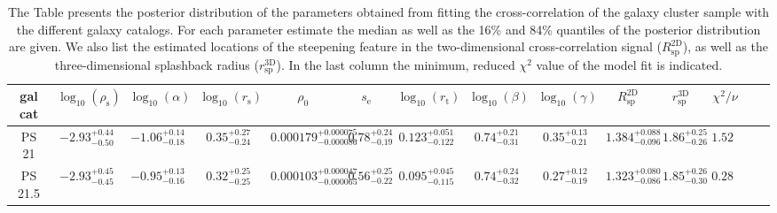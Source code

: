 \documentclass[iop, apjl, twocolappendix, numberedappendix]{emulateapj}
\begin{document}

\begin{table}
    \centering
    \caption{The Table presents the posterior distribution of the parameters obtained from fitting the cross-correlation of the galaxy cluster sample with the different galaxy catalogs. For each parameter estimate the median as well as the 16\% and 84\% quantiles of the posterior distribution are given. We also list the estimated locations of the steepening feature in the two-dimensional cross-correlation signal ($R_{\mathrm{sp}}^{\mathrm{2D}}$), as well as the three-dimensional splashback radius ($r_{\mathrm{sp}}^{\mathrm{3D}}$). In the last column the minimum, reduced $\chi^2$ value of the model fit is indicated.}
    \label{tab:fit_parameters}
    \begin{tabular}{cccccccccccccc}
    \hline 
gal cat & $\log_{10}(\rho_{\mathrm{s}})$ & $\log_{10}(\alpha)$ & $\log_{10}(r_{\mathrm{s}})$ & $\rho_{\mathrm{0}}$ & $s_{\mathrm{e}}$ & $\log_{10}(r_{\mathrm{t}})$ & $\log_{10}(\beta)$ & $\log_{10}(\gamma)$ & $R_{\mathrm{sp}}^{\mathrm{2D}}$ & $r_{\mathrm{sp}}^{\mathrm{3D}}$ & $\chi^2/\nu$ \\
\hline 
\hline 
PS 21 & $-2.93_{-0.50}^{+0.44}$ & $-1.06_{-0.18}^{+0.14}$ & $0.35_{-0.24}^{+0.27}$ & $0.000179_{-0.000086}^{+0.000075}$ & $0.78_{-0.19}^{+0.24}$ & $0.123_{-0.122}^{+0.051}$ & $0.74_{-0.31}^{+0.21}$ & $0.35_{-0.21}^{+0.13}$ &$1.384_{-0.096}^{+0.088}$&$1.86_{-0.26}^{+0.25}$& $1.524$ \\
\hline
PS 21.5 & $-2.93_{-0.45}^{+0.45}$ & $-0.95_{-0.16}^{+0.13}$ & $0.32_{-0.25}^{+0.25}$ & $0.000103_{-0.000065}^{+0.000047}$ & $0.56_{-0.22}^{+0.25}$ & $0.095_{-0.115}^{+0.045}$ & $0.74_{-0.32}^{+0.24}$ & $0.27_{-0.19}^{+0.12}$ &$1.323_{-0.086}^{+0.080}$&$1.85_{-0.30}^{+0.26}$& $0.285$ \\

\end{tabular}
\end{table}
\end{document}
